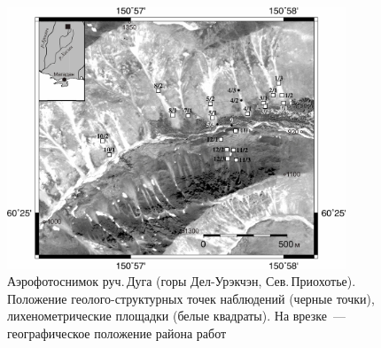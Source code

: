 \begin{figure}
  \begin{center}
    \includegraphics[width=0.9\textwidth]{authors/kolegov-fig.jpg}
  \end{center}
  \caption*{Аэрофотоснимок руч.\,Дуга (горы Дел-Урэкчэн, Сев.\,Приохотье).
  Положение геолого-структурных точек наблюдений (черные точки),
  лихенометрические площадки (белые квадраты). На врезке~--- географическое
  положение района работ}
  \label{fig:kolegov}
\end{figure}

